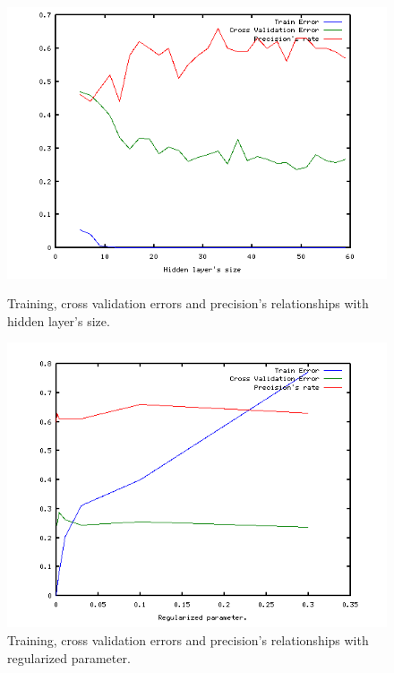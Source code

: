 \documentclass[a4paper, 11pt]{article}
\begin{document}
\begin{figure}[t]
  \centering
  \includegraphics[scale=0.8]{5}
  \caption{Training, cross validation errors and precision's relationships with hidden layer's size.}
  \includegraphics[scale=0.8]{6}
  \caption{Training, cross validation errors and precision's relationships with regularized parameter.}
\end{figure}
\end{document}
